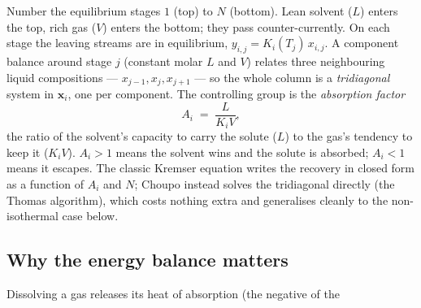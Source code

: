 \documentclass[11pt,a4paper]{article}
\begin{document}
Number the equilibrium stages $1$ (top) to $N$ (bottom).  Lean solvent
($L$) enters the top, rich gas ($V$) enters the bottom; they pass
counter-currently.  On each stage the leaving streams are in
equilibrium, $y_{i,j} = K_i(T_j)\,x_{i,j}$.  A component balance around
stage $j$ (constant molar $L$ and $V$) relates three neighbouring
liquid compositions --- $x_{j-1}, x_j, x_{j+1}$ --- so the whole column
is a \emph{tridiagonal} system in $\mathbf{x}_i$, one per component.
The controlling group is the \emph{absorption factor}
\begin{equation}
   A_i \;=\; \frac{L}{K_i V},
   \label{eq:abs-factor}
\end{equation}
the ratio of the solvent's capacity to carry the solute ($L$) to the
gas's tendency to keep it ($K_i V$).  $A_i>1$ means the solvent wins
and the solute is absorbed; $A_i<1$ means it escapes.  The classic
Kremser equation writes the recovery in closed form as a function of
$A_i$ and $N$; Choupo instead solves the tridiagonal directly (the
Thomas algorithm), which costs nothing extra and generalises cleanly to
the non-isothermal case below.

\subsection{Why the energy balance matters}

Dissolving a gas releases its heat of absorption (the negative of the
\end{document}
